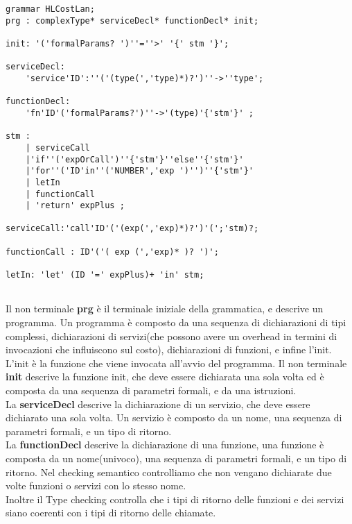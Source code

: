 \documentclass[../../main.tex]{subfiles}
\begin{document}
\begin{lstlisting}[language=ANTLR, caption={Grammatica del linguaggio HLCostLan}, label={lst:grammatica}]
grammar HLCostLan;
prg : complexType* serviceDecl* functionDecl* init;
    
init: '('formalParams? ')''=''>' '{' stm '}';
    
serviceDecl:
    'service'ID':''('(type(','type)*)?')''->''type';
    
functionDecl:
    'fn'ID'('formalParams?')''->'(type)'{'stm'}' ;
    
stm :
    | serviceCall
    |'if''('expOrCall')''{'stm'}''else''{'stm'}'
    |'for''('ID'in''('NUMBER','exp ')'')''{'stm'}'  
    | letIn
    | functionCall
    | 'return' expPlus ;
    
serviceCall:'call'ID'('(exp(','exp)*)?')'(';'stm)?;

functionCall : ID'('( exp (','exp)* )? ')';

letIn: 'let' (ID '=' expPlus)+ 'in' stm;
                                   
\end{lstlisting}
Il non terminale \textbf{prg} è il terminale iniziale della grammatica, e descrive un programma. Un programma è composto da una sequenza di dichiarazioni di tipi complessi, dichiarazioni di servizi(che possono avere un overhead in termini di invocazioni che influiscono sul costo), dichiarazioni di funzioni, e infine l'init. L'init è la funzione che viene invocata all'avvio del programma.
Il non terminale \textbf{init} descrive la funzione init, che deve essere dichiarata una sola volta ed è composta da una sequenza di parametri formali, e da una istruzioni.\\
La \textbf{serviceDecl} descrive la dichiarazione di un servizio, che deve essere dichiarato una sola volta. Un servizio è composto da un nome, una sequenza di parametri formali, e un tipo di ritorno.\\
La \textbf{functionDecl} descrive la dichiarazione di una funzione, una funzione è composta da un nome(univoco), una sequenza di parametri formali, e un tipo di ritorno.
Nel checking semantico controlliamo che non vengano dichiarate due volte funzioni o servizi con lo stesso nome.\\
Inoltre il Type checking controlla che i tipi di ritorno delle funzioni e dei servizi siano coerenti con i tipi di ritorno delle chiamate.\\
\end{document}
